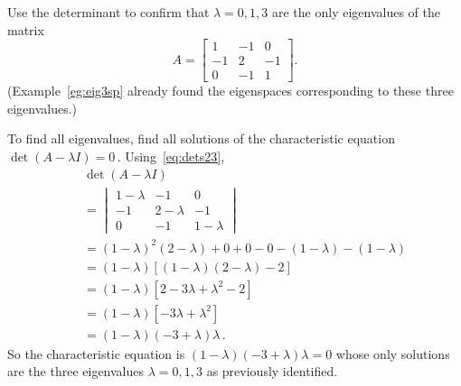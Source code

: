 \begin{example} \label{eg:eig3introval}
Use the determinant to confirm that \(\lambda=0,1,3\) are the only eigenvalues of the matrix
\begin{equation*}
A=\begin{bmatrix} 1&-1&0\\-1&2&-1\\0&-1&1 \end{bmatrix}.
\end{equation*}
(Example~\ref{eg:eig3sp} already found the eigenspaces corresponding to these three eigenvalues.)
\begin{solution} 
To find all eigenvalues, find all solutions of the characteristic equation \(\det(A-\lambda I)=0\)\,.  
Using~\eqref{eq:dets23},
\begin{eqnarray*}
&&\det(A-\lambda I)
\\&&{}=\begin{vmatrix} 1-\lambda&-1&0\\-1&2-\lambda&-1\\0&-1&1-\lambda \end{vmatrix}
\\&&{}=(1-\lambda)^2(2-\lambda)+0+0-0-(1-\lambda)-(1-\lambda)
\\&&{}=(1-\lambda)\left[(1-\lambda)(2-\lambda)-2\right]
\\&&{}=(1-\lambda)\left[2-3\lambda+\lambda^2-2\right]
\\&&{}=(1-\lambda)\left[-3\lambda+\lambda^2\right]
\\&&{}=(1-\lambda)(-3+\lambda)\lambda\,.
\end{eqnarray*}
So the characteristic equation is \((1-\lambda)(-3+\lambda)\lambda=0\) whose only solutions are the three eigenvalues \(\lambda=0,1,3\) as previously identified.
\end{solution}
\end{example}



